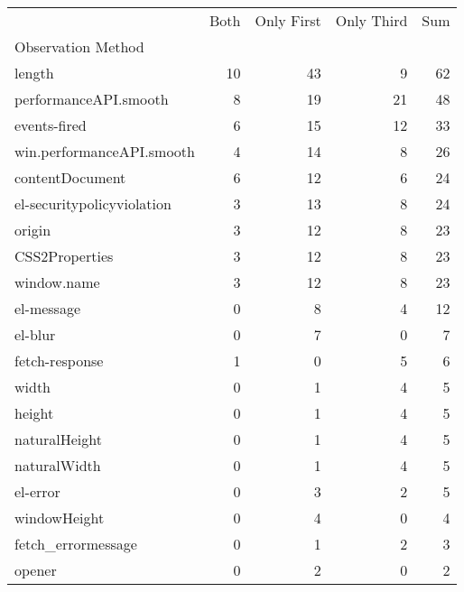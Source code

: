 \begin{tabular}{lrrrr}
 & Both & Only First & Only Third & Sum \\
Observation Method &  &  &  &  \\
length & 10 & 43 & 9 & 62 \\
performanceAPI.smooth & 8 & 19 & 21 & 48 \\
events-fired & 6 & 15 & 12 & 33 \\
win.performanceAPI.smooth & 4 & 14 & 8 & 26 \\
contentDocument & 6 & 12 & 6 & 24 \\
el-securitypolicyviolation & 3 & 13 & 8 & 24 \\
origin & 3 & 12 & 8 & 23 \\
CSS2Properties & 3 & 12 & 8 & 23 \\
window.name & 3 & 12 & 8 & 23 \\
el-message & 0 & 8 & 4 & 12 \\
el-blur & 0 & 7 & 0 & 7 \\
fetch-response & 1 & 0 & 5 & 6 \\
width & 0 & 1 & 4 & 5 \\
height & 0 & 1 & 4 & 5 \\
naturalHeight & 0 & 1 & 4 & 5 \\
naturalWidth & 0 & 1 & 4 & 5 \\
el-error & 0 & 3 & 2 & 5 \\
windowHeight & 0 & 4 & 0 & 4 \\
fetch_errormessage & 0 & 1 & 2 & 3 \\
opener & 0 & 2 & 0 & 2 \\
\end{tabular}
